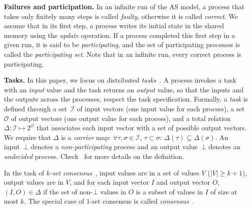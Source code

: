 \documentclass[a4paper]{article}
\newcommand{\myparagraph}[1]{\vspace{6pt}\noindent \textbf{#1}}
\newcommand{\remove}[1]{}
\def\I{\ensuremath{\mathcal{I}}}
\def\O{\ensuremath{\mathcal{O}}}
\def\O {\mathcal{O}}
\def\I {\mathcal{I}}
\begin{document}
\myparagraph{Failures and participation.}
%
In an infinite run of the AS model,
a process that takes only  finitely many steps
is called \emph{faulty}, otherwise it is called 
\emph{correct}. We assume that in its first step, a process 
writes its initial state in the shared memory using the \emph{update} operation. If a process 
completed this first step in a given run, it is said to be
\emph{participating}, and the set of participating processes is called
the \emph{participating set}.
Note that in an infinite run, every correct process is participating.

\remove{
In contrast, the IIS model does not have the notion of a faulty 
process. Instead, a process may appear 
``slow''~\cite{RS12,Gaf98-iis,BGK14}, i.e., be late in accessing 
iterated memories from some point on so that some ``faster'' 
processes do not see them. 
}

\myparagraph{Tasks.}
%
In this paper, we focus on distributed \emph{tasks}~\cite{HS99}. 
A process invokes a task with an \emph{input} value and the task 
returns an \emph{output} value, so that the inputs and the outputs 
across the processes, respect the task 
specification.
Formally, a \emph{task} is defined through a set~$\I$ of input 
vectors (one input value for each process), a set~$\O$ of output 
vectors (one output value for each process), and a total 
relation~$\Delta:\I\mapsto 2^{\O}$ that associates each input 
vector with a set of possible output vectors.
We require that $\Delta$ is a \emph{carrier} map: $\forall \tau,\sigma
\in \I$, $\tau\subset\sigma$: $\Delta(\tau)\subseteq \Delta(\sigma)$.  
An input~$\bot$  denotes a \emph{non-participating} process and an output 
value~$\bot$ denotes an \emph{undecided} process. 
Check~\cite{HKR14} for more details on the definition.

In the task of \emph{$k$-set consensus}~\cite{Cha90}, input values are in a set of values $V$ ($|V|\geq k+1$), output values
are in $V$, and for each input vector $I$ and output vector $O$, $(I,O) \in\Delta$ if the set of non-$\bot$
values in $O$ is a subset of values in $I$ of size at most $k$.
The special case of $1$-set consensus is called \emph{consensus}~\cite{FLP85}. 
\end{document}
